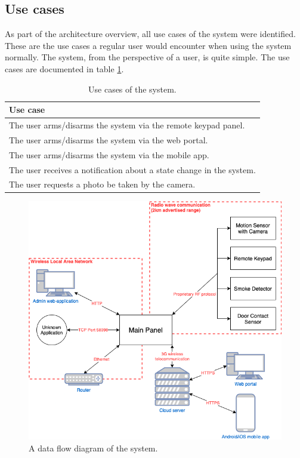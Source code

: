 \subsection{Use cases}
As part of the architecture overview, all use cases of the system were identified. These are the use cases a regular user would encounter when using the system normally. The system, from the perspective of a user, is quite simple. The use cases are documented in table \ref{tb:use-cases}.
\begin{table}[!ht]
    \centering
    \begin{tabular}{l}
        \hline
        \textbf{Use case}
        \\ \hline
        The user arms/disarms the system via the remote keypad panel.
        \\
        The user arms/disarms the system via the web portal.
        \\
        The user arms/disarms the system via the mobile app.
        \\
        The user receives a notification about a state change in the system.
        \\
        The user requests a photo be taken by the camera.
        \\ \hline
    \end{tabular}
    \caption{Use cases of the system.}
    \label{tb:use-cases}
\end{table}

\begin{figure}[!p]
    \centering
    \includegraphics[width=\textwidth]{images/5-threat-model/system-overview.png}
    \caption{A data flow diagram of the system.}
    \label{fig:system-overview}
\end{figure}

